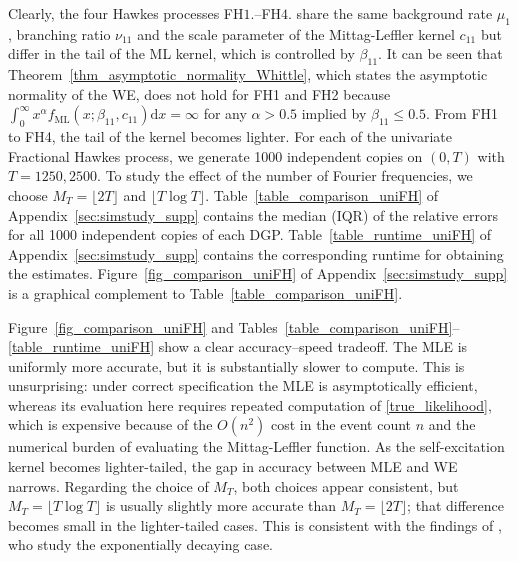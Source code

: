 \documentclass[11pt]{article}
\numberwithin{equation}{section}
\theoremstyle{plain}
\theoremstyle{definition}
\theoremstyle{definition}
\theoremstyle{assumption}
\theoremstyle{proposition}
\theoremstyle{proposition}
\theoremstyle{example}
\theoremstyle{lemma}
\theoremstyle{theorem}
\theoremstyle{remark}
\begin{document}
Clearly, the four Hawkes processes FH${1.}$--FH${4.}$ share the same background rate $\mu_1$, branching ratio $\nu_{11}$ and the scale parameter of the Mittag-Leffler kernel $c_{11}$ but differ in the tail of the ML kernel, which is controlled by $\beta_{11}$. It can be seen that Theorem~\ref{thm_asymptotic_normality_Whittle}, which states the asymptotic normality of the WE, does not hold for FH1 and FH2 because $\int_0^{\infty}x^{\alpha}f_{\mathrm{ML}}(x;\beta_{11},c_{11})\mathrm{d}x=\infty$ for any $\alpha>0.5$ implied by $\beta_{11}\leqslant0.5$. From FH1 to FH4, the tail of the kernel becomes lighter. For each of the univariate Fractional Hawkes process, we generate 1000 independent copies on $(0,T)$ with $T=1250,2500$. To study the effect of the number of Fourier frequencies, we choose $M_T = \lfloor 2T\rfloor$ and $\lfloor T\log T\rfloor$. Table~\ref{table_comparison_uniFH} of Appendix~\ref{sec:simstudy_supp} contains the median (IQR) of the relative errors for all 1000 independent copies of each DGP. Table~\ref{table_runtime_uniFH} of Appendix~\ref{sec:simstudy_supp} contains the corresponding runtime for obtaining the estimates. Figure~\ref{fig_comparison_uniFH} of Appendix~\ref{sec:simstudy_supp} is a graphical complement to Table~\ref{table_comparison_uniFH}.

Figure~\ref{fig_comparison_uniFH} and Tables~\ref{table_comparison_uniFH}--\ref{table_runtime_uniFH} show a clear accuracy--speed tradeoff. The MLE is uniformly more accurate, but it is substantially slower to compute. This is unsurprising: under correct specification the MLE is asymptotically efficient, whereas its evaluation here requires repeated computation of \eqref{true_likelihood}, which is expensive because of the $O(n^2)$ cost in the event count $n$ and the numerical burden of evaluating the Mittag-Leffler function. As the self-excitation kernel becomes lighter-tailed, the gap in accuracy between MLE and WE narrows. Regarding the choice of $M_T$, both choices appear consistent, but $M_T=\lfloor T\log T\rfloor$ is usually slightly more accurate than $M_T=\lfloor 2T\rfloor$; that difference becomes small in the lighter-tailed cases. This is consistent with the findings of \citet[Section~5.1.2]{Bonnet_et_al2025}, who study the exponentially decaying case.
\end{document}
